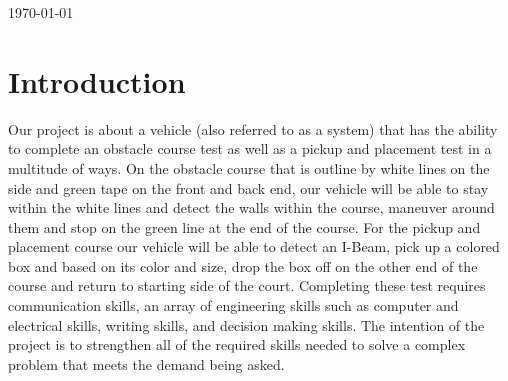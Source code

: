 \documentclass[11pt]{article}
\begin{document}
\begin{titlepage}
    \centering
    \Huge \textbf{\TITLENAME}
    
    \vspace{1cm}
    
    \Large \NAMES
    
    \vspace{0.5cm}
    
    \large \SCHOOLNAME
    
    \vfill
    
    \today
    
\end{titlepage}


\renewcommand{\contentsname}{Contents}
\tableofcontents
\newpage


\section{Introduction}
Our project is about a vehicle (also referred to as a system) that has the ability to complete an obstacle course test as well as a pickup and placement test in a multitude of ways. On the obstacle course that is outline by white lines on the side and green tape on the front and back end, our vehicle will be able to stay within the white lines and detect the walls within the course, maneuver around them and stop on the green line at the end of the course. For the pickup and placement course our vehicle will be able to detect an I-Beam, pick up a colored box and based on its color and size, drop the box off on the other end of the course and return to starting side of the court. Completing these test requires communication skills, an array of engineering skills such as computer and electrical skills, writing skills, and decision making skills. The intention of the project is to strengthen all of the required skills needed to solve a complex problem that meets the demand being asked. 
\end{document}
